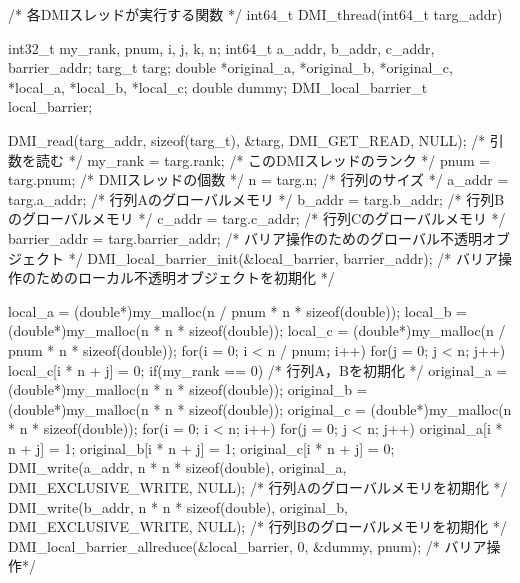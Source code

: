 \documentclass[report,12pt]{jsbook}
\begin{document}
\begin{code}
/* 各DMIスレッドが実行する関数 */
int64_t DMI_thread(int64_t targ_addr)
{
  int32_t my_rank, pnum, i, j, k, n;
  int64_t a_addr, b_addr, c_addr, barrier_addr;
  targ_t targ;
  double *original_a, *original_b, *original_c, *local_a, *local_b, *local_c;
  double dummy;
  DMI_local_barrier_t local_barrier;
  
  DMI_read(targ_addr, sizeof(targ_t), &targ, DMI_GET_READ, NULL);  /* 引数を読む */
  my_rank = targ.rank;  /* このDMIスレッドのランク */
  pnum = targ.pnum;  /* DMIスレッドの個数 */
  n = targ.n;  /* 行列のサイズ */
  a_addr = targ.a_addr;  /* 行列Aのグローバルメモリ */
  b_addr = targ.b_addr;  /* 行列Bのグローバルメモリ */
  c_addr = targ.c_addr;  /* 行列Cのグローバルメモリ */
  barrier_addr = targ.barrier_addr;  /* バリア操作のためのグローバル不透明オブジェクト */
  DMI_local_barrier_init(&local_barrier, barrier_addr);  /* バリア操作のためのローカル不透明オブジェクトを初期化 */
  
  local_a = (double*)my_malloc(n / pnum * n * sizeof(double));
  local_b = (double*)my_malloc(n * n * sizeof(double));
  local_c = (double*)my_malloc(n / pnum * n * sizeof(double));
  for(i = 0; i < n / pnum; i++)
    {
      for(j = 0; j < n; j++)
        {
          local_c[i * n + j] = 0;
        }
    }
  if(my_rank == 0)  /* 行列A，Bを初期化 */
    {
      original_a = (double*)my_malloc(n * n * sizeof(double));
      original_b = (double*)my_malloc(n * n * sizeof(double));
      original_c = (double*)my_malloc(n * n * sizeof(double));
      for(i = 0; i < n; i++)
        {
          for(j = 0; j < n; j++)
            {
              original_a[i * n + j] = 1;
              original_b[i * n + j] = 1;
              original_c[i * n + j] = 0;
            }
        }
      DMI_write(a_addr, n * n * sizeof(double), original_a, DMI_EXCLUSIVE_WRITE, NULL);  /* 行列Aのグローバルメモリを初期化 */
      DMI_write(b_addr, n * n * sizeof(double), original_b, DMI_EXCLUSIVE_WRITE, NULL);  /* 行列Bのグローバルメモリを初期化 */
    }
  DMI_local_barrier_allreduce(&local_barrier, 0, &dummy, pnum);  /* バリア操作*/
  
}
\end{code}
\end{document}
